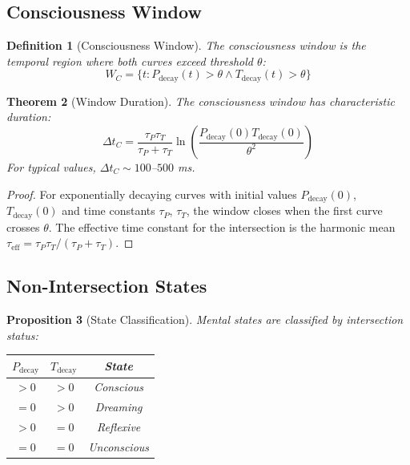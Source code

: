 \documentclass[twocolumn,amsmath,amssymb,aps,prl,superscriptaddress]{revtex4-2}
\newtheorem{theorem}{Theorem}[section]
\newtheorem{proposition}[theorem]{Proposition}
\newtheorem{definition}[theorem]{Definition}
\newcommand{\Pdecay}{P_{\text{decay}}}
\newcommand{\Tdecay}{T_{\text{decay}}}
\begin{document}
\subsection{Consciousness Window}

\begin{definition}[Consciousness Window]
The consciousness window is the temporal region where both curves exceed threshold $\theta$:
\begin{equation}
W_C = \{t : \Pdecay(t) > \theta \land \Tdecay(t) > \theta\}
\end{equation}
\end{definition}

\begin{theorem}[Window Duration]
\label{thm:window}
The consciousness window has characteristic duration:
\begin{equation}
\Delta t_C = \frac{\tau_P \tau_T}{\tau_P + \tau_T} \ln\left(\frac{\Pdecay(0) \Tdecay(0)}{\theta^2}\right)
\end{equation}
For typical values, $\Delta t_C \sim 100$--$500$ ms.
\end{theorem}

\begin{proof}
For exponentially decaying curves with initial values $\Pdecay(0)$, $\Tdecay(0)$ and time constants $\tau_P$, $\tau_T$, the window closes when the first curve crosses $\theta$. The effective time constant for the intersection is the harmonic mean $\tau_{\text{eff}} = \tau_P \tau_T / (\tau_P + \tau_T)$.
\end{proof}

\subsection{Non-Intersection States}

\begin{proposition}[State Classification]
Mental states are classified by intersection status:
\begin{center}
\begin{tabular}{ccc}
\toprule
$\Pdecay$ & $\Tdecay$ & State \\
\midrule
$> 0$ & $> 0$ & Conscious \\
$= 0$ & $> 0$ & Dreaming \\
$> 0$ & $= 0$ & Reflexive \\
$= 0$ & $= 0$ & Unconscious \\
\bottomrule
\end{tabular}
\end{center}
\end{proposition}
\end{document}
